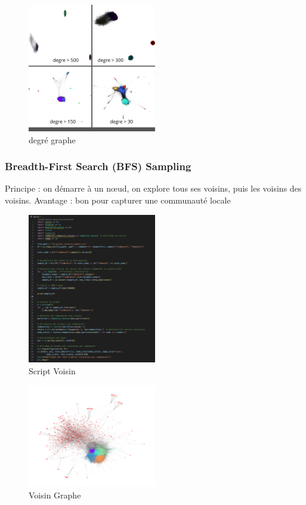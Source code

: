 \documentclass[a4paper, 12pt, twoside]{article}
\begin{document}
        \begin{figure}[H]
            \centering
            \includegraphics[width=0.5\textwidth]{degre graphe.png}
            \caption{degré graphe}
            \label{fig:label_image}
        \end{figure}
        
    \subsubsection{Breadth-First Search (BFS) Sampling}   
    Principe : on démarre à un nœud, on explore tous ses voisins, puis les voisins des voisins.
    Avantage : bon pour capturer une communauté locale
        \begin{figure}[H]
            \centering
            \includegraphics[width=0.5\textwidth]{voisin.png}
            \caption{Script Voisin}
            \label{fig:label_image}
        \end{figure}

        \begin{figure}[H]
            \centering
            \includegraphics[width=0.5\textwidth]{voisin graphe.png}
            \caption{Voisin Graphe}
            \label{fig:label_image}
        \end{figure}
\end{document}
